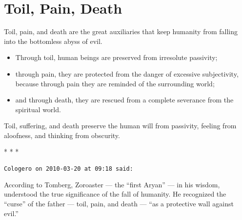 \section{Toil, Pain, Death}

\begin{quotex}
Toil, pain, and death are the great auxiliaries that keep humanity from falling into the bottomless abyss of evil.

\begin{itemize}


\item Through toil, human beings are preserved from irresolute passivity;

\item through pain, they are protected from the danger of excessive subjectivity, because through pain they are reminded of the surrounding world;

\item and through death, they are rescued from a complete severance from the spiritual world.
\end{itemize}

Toil, suffering, and death preserve the human will from passivity, feeling from aloofness, and thinking from obscurity.

\end{quotex}




\begin{center}* * *\end{center}

\begin{footnotesize}
\begin{sffamily}
\texttt{Cologero on 2010-03-20 at 09:18 said:}

According to Tomberg, Zoroaster --- the ``first Aryan'' --- in his wisdom, understood the true significance of the fall of humanity. He recognized the ``curse'' of the father --- toil, pain, and death --- ``as a protective wall against evil.''

\end{sffamily}
\end{footnotesize}

